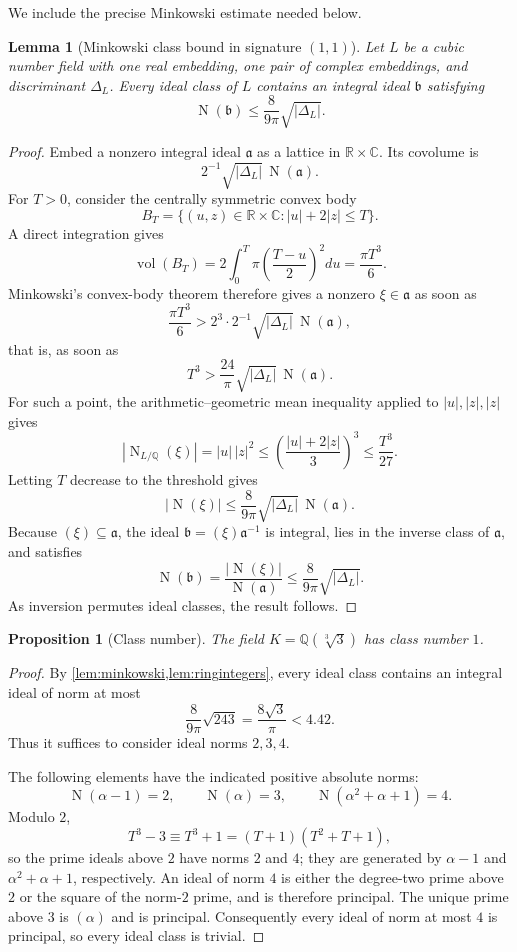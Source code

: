 \documentclass[11pt,a4paper]{article}
\newtheorem{lemma}[lemma]{Lemma}
\newtheorem{proposition}[proposition]{Proposition}
\newcommand{\Q}{\mathbb Q}
\newcommand{\Norm}{\operatorname{N}}
\begin{document}
We include the precise Minkowski estimate needed below.

\begin{lemma}[Minkowski class bound in signature $(1,1)$]\label{lem:minkowski}
Let $L$ be a cubic number field with one real embedding, one pair of
complex embeddings, and discriminant $\Delta_L$.  Every ideal class of
$L$ contains an integral ideal $\mathfrak b$ satisfying
\[
\Norm(\mathfrak b)
 \le \frac{8}{9\pi}\sqrt{|\Delta_L|}.
\]
\end{lemma}

\begin{proof}
Embed a nonzero integral ideal $\mathfrak a$ as a lattice in
$\mathbb R\times\mathbb C$.  Its covolume is
\[
2^{-1}\sqrt{|\Delta_L|}\,\Norm(\mathfrak a).
\]
For $T>0$, consider the centrally symmetric convex body
\[
B_T=\{(u,z)\in\mathbb R\times\mathbb C: |u|+2|z|\le T\}.
\]
A direct integration gives
\[
\operatorname{vol}(B_T)
 =2\int_0^T \pi\left(\frac{T-u}{2}\right)^2du
 =\frac{\pi T^3}{6}.
\]
Minkowski's convex-body theorem therefore gives a nonzero
$\xi\in\mathfrak a$ as soon as
\[
\frac{\pi T^3}{6}
 >2^3\cdot2^{-1}\sqrt{|\Delta_L|}\,\Norm(\mathfrak a),
\]
that is, as soon as
\[
T^3>\frac{24}{\pi}\sqrt{|\Delta_L|}\,\Norm(\mathfrak a).
\]
For such a point, the arithmetic--geometric mean inequality applied to
$|u|,|z|,|z|$ gives
\[
|\Norm_{L/\Q}(\xi)|=|u|\,|z|^2
 \le \left(\frac{|u|+2|z|}{3}\right)^3
 \le \frac{T^3}{27}.
\]
Letting $T$ decrease to the threshold gives
\[
|\Norm(\xi)|
 \le \frac{8}{9\pi}\sqrt{|\Delta_L|}\,\Norm(\mathfrak a).
\]
Because $(\xi)\subseteq\mathfrak a$, the ideal
$\mathfrak b=(\xi)\mathfrak a^{-1}$ is integral, lies in the inverse
class of $\mathfrak a$, and satisfies
\[
\Norm(\mathfrak b)
 =\frac{|\Norm(\xi)|}{\Norm(\mathfrak a)}
 \le\frac{8}{9\pi}\sqrt{|\Delta_L|}.
\]
As inversion permutes ideal classes, the result follows.
\end{proof}

\begin{proposition}[Class number]\label{prop:classnumber}
The field $K=\Q(\sqrt[3]{3})$ has class number $1$.
\end{proposition}

\begin{proof}
By \cref{lem:minkowski,lem:ringintegers}, every ideal class contains an
integral ideal of norm at most
\[
\frac{8}{9\pi}\sqrt{243}
 =\frac{8\sqrt3}{\pi}<4.42.
\]
Thus it suffices to consider ideal norms $2,3,4$.

The following elements have the indicated positive absolute norms:
\[
\Norm(\alpha-1)=2,
\qquad
\Norm(\alpha)=3,
\qquad
\Norm(\alpha^2+\alpha+1)=4.
\]
Modulo $2$,
\[
T^3-3\equiv T^3+1=(T+1)(T^2+T+1),
\]
so the prime ideals above $2$ have norms $2$ and $4$; they are generated
by $\alpha-1$ and $\alpha^2+\alpha+1$, respectively.  An ideal of norm
$4$ is either the degree-two prime above $2$ or the square of the
norm-$2$ prime, and is therefore principal.  The unique prime above $3$
is $(\alpha)$ and is principal.  Consequently every ideal of norm at most
$4$ is principal, so every ideal class is trivial.
\end{proof}
\end{document}
